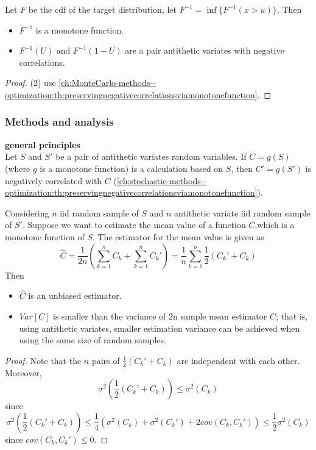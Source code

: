 \begin{refsection}
\begin{lemma}\cite[205]{glasserman2003monte}
	Let $F$ be the cdf of the target distribution, let $F^{-1} = \inf\{F^{-1}(x>u)\}$. Then
	\begin{itemize}
		\item $F^{-1}$ is a monotone function.
		\item $F^{-1}(U)$ and $F^{-1}(1-U)$ are a pair antithetic variates with negative correlations.
	\end{itemize}
\end{lemma}
\begin{proof}
	(2) use \autoref{ch:MonteCarlo-methods--optimization:th:preservingnegativecorrelationsviamonotonefunction}.
\end{proof}

\subsubsection{Methods and analysis}
\begin{mdframed}
	\textbf{general principles}\\
	Let $S$ and $S'$ be a pair of antithetic variates random variables.  
	If $C = g(S)$ (where $g$ is a monotone function) is a calculation based on  $S$, then $C'=g(S')$ is negatively correlated with $C$ (\autoref{ch:stochastic-methods--optimization:th:preservingnegativecorrelationsviamonotonefunction}). 
\end{mdframed}

\begin{lemma}
	Considering $n$ iid random sample of $S$ and $n$ antithetic variate iid random sample of $S'$. Suppose we want to estimate the mean value of a function $C$,which is a monotone function of $S$. The estimator for the mean value is given as 
	$$\hat{C} = \frac{1}{2n}(\sum_{k=1}^n C_k + \sum_{k=1}^n C_k') = \frac{1}{n}\sum_{k=1}^n \frac{1}{2}(C_k' + C_k)$$ 
	Then 
	\begin{itemize}
		\item $\hat{C}$ is an unbiased estimator.
		\item $Var[C]$ is smaller than the variance of 2n sample mean estimator $C$; that is, using antithetic variates, smaller estimation variance can be achieved when using the same size of random samples. 
	\end{itemize}
\end{lemma}

\begin{proof}
	Note that the $n$ pairs of $ \frac{1}{2}(C_k' + C_k)$ are independent with each other. Moreover, $$\sigma^2( \frac{1}{2}(C_k' + C_k)) \leq \sigma^2(C_k)$$ since 
	$$\sigma^2( \frac{1}{2}(C_k' + C_k)) \leq \frac{1}{4}(\sigma^2(C_k) + \sigma^2(C_k') + 2cov(C_k,C_k')) \leq \frac{1}{2}\sigma^2(C_k)$$
	since $cov(C_k,C_k') \leq 0$.
	

\end{proof}
\end{refsection}
